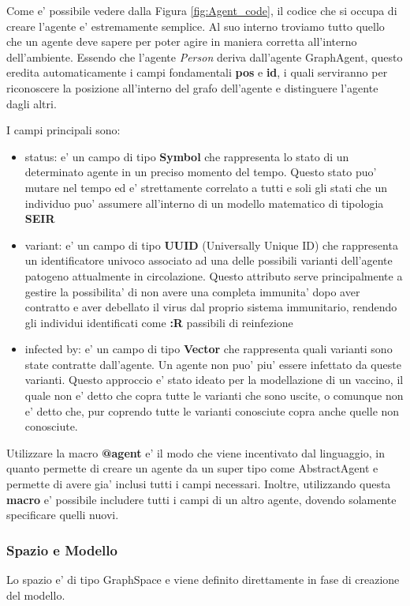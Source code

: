 Come e' possibile vedere dalla Figura \ref{fig:Agent_code}, il codice che si occupa
di creare l'agente e' estremamente semplice. Al suo interno troviamo tutto quello che 
un agente deve sapere per poter agire in maniera corretta all'interno dell'ambiente. 
Essendo che l'agente \emph{Person} deriva dall'agente GraphAgent, questo eredita 
automaticamente i campi fondamentali \textbf{pos} e \textbf{id}, i quali serviranno 
per riconoscere la posizione all'interno del grafo dell'agente e distinguere l'agente 
dagli altri.

I campi principali sono:
\begin{itemize}
	\item status: e' un campo di tipo \textbf{Symbol} che rappresenta 
	lo stato di un determinato agente in un preciso momento del tempo. 
	Questo stato puo' mutare nel tempo ed e' strettamente correlato a 
	tutti e soli gli stati che un individuo puo' assumere all'interno di
	un modello matematico di tipologia \textbf{SEIR}
	\item variant:  e' un campo di tipo \textbf{UUID} (Universally Unique ID)
	che rappresenta un identificatore univoco associato ad una delle possibili
	varianti dell'agente patogeno attualmente in circolazione. Questo attributo 
	serve principalmente a gestire la possibilita' di non avere una completa
	immunita' dopo aver contratto e aver debellato il virus dal proprio sistema 
	immunitario, rendendo gli individui identificati come \textbf{:R} 
	passibili di reinfezione
	\item infected by: e' un campo di tipo \textbf{Vector} che rappresenta 
	quali varianti sono state contratte dall'agente. Un agente non puo' piu'
	essere infettato da queste varianti. Questo approccio e' stato ideato per 
	la modellazione di un vaccino, il quale non e' detto che copra tutte le
	varianti che sono uscite, o comunque non e' detto che, pur coprendo tutte le
	varianti conosciute copra anche quelle non conosciute.
\end{itemize}

Utilizzare la macro \textbf{@agent} e' il modo che viene incentivato dal linguaggio, in quanto
permette di creare un agente da un super tipo come AbstractAgent e permette di avere 
gia' inclusi tutti i campi necessari. Inoltre, utilizzando questa \textbf{macro} e' 
possibile includere tutti i campi di un altro agente, dovendo solamente specificare quelli 
nuovi.

\subsubsection*{Spazio e Modello}
Lo spazio e' di tipo GraphSpace e viene definito direttamente in 
fase di creazione del modello. 


